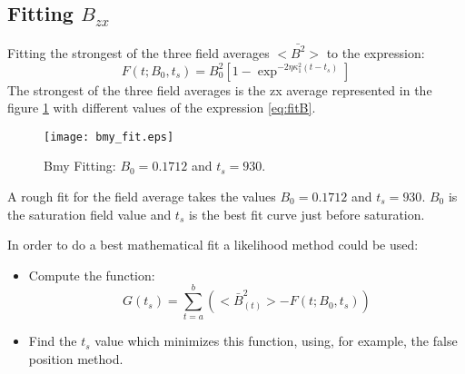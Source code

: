 \subsection{Fitting $B_{zx}$}
Fitting the strongest of the three field averages $<\bar{B^2}>$ to the expression:
\begin{equation}
 F(t;B_0,t_s)=B_0^2[1-\exp^{-2\eta\kappa_1^2(t-t_s)}]
\label{eq:fitB}
\end{equation}
The strongest of the three field averages is the zx average represented in the figure \ref{fig:bmy_fit} with different values of the expression \ref{eq:fitB}.
\begin{figure}[h]
\centering
\texttt{[image: bmy\_fit.eps]}
\caption{Bmy Fitting: $B_0=0.1712$ and $t_s = 930$.}
\label{fig:bmy_fit}
 \end{figure}
A rough fit for the field average takes the values $B_0=0.1712$ and $t_s = 930$.
$B_0$ is the saturation field value and $t_s$ is the best fit curve just before saturation.

In order to do a best mathematical fit a likelihood method could be used: 
\begin{itemize}
 \item Compute the function:
\begin{equation}
 G(t_s) = \sum_{t=a}^b (<\bar{B}^2_{(t)}>-F(t;B_0,t_s))
\end{equation}
\item Find the $t_s$ value which minimizes this function, using, for example, the false position method.

\end{itemize}
